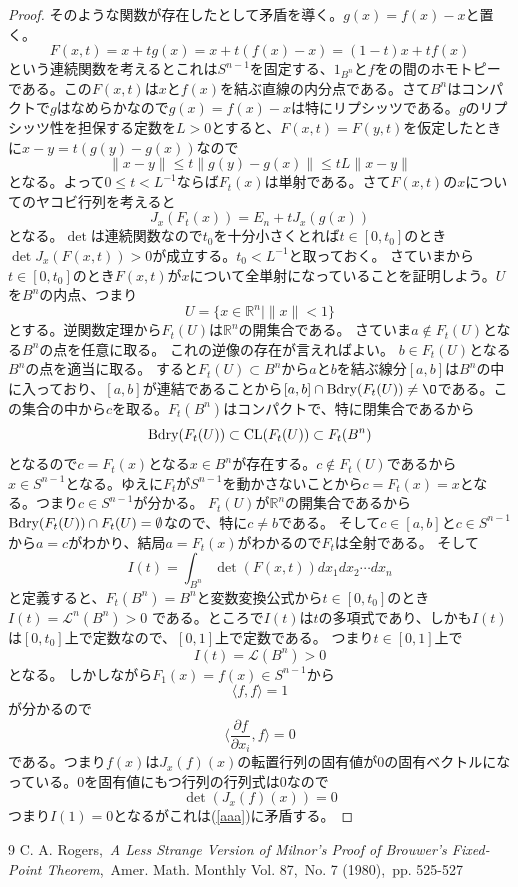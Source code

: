 \documentclass[leqno]{jsarticle}
\newcommand{\rr}{\mathbb{R}}
\newcommand{\bd}{\text{{\rm Bdry}}}
\newcommand{\cl}{\text{{\rm CL}}}
\newcommand{\LL}{\mathcal{L}}
\begin{document}
\begin{proof}
そのような関数が存在したとして矛盾を導く。$g(x)=f(x)-x$と置く。
\[
F(x,t)=x+tg(x)=x+t(f(x)-x)=(1-t)x+tf(x)
\]
という連続関数を考えるとこれは$S^{n-1}$を固定する、$1_{B^n}$と$f$をの間のホモトピーである。この$F(x,t)$は$x$と$f(x)$を結ぶ直線の内分点である。さて$B^n$はコンパクトで$g$はなめらかなので$g(x)=f(x)-x$は特にリプシッツである。$g$のリプシッツ性を担保する定数を$L>0$とすると、$F(x,t)=F(y,t)$を仮定したときに$x-y=t(g(y)-g(x))$なので
\[
\|x-y\|\le t\|g(y)-g(x)\|\le tL\|x-y\|
\]
となる。よって$0\le t< L^{-1}$ならば$F_t(x)$は単射である。さて$F(x,t)$の$x$についてのヤコビ行列を考えると
\[
J_x(F_t(x))=E_n+tJ_x(g(x))
\]
となる。$\det$は連続関数なので$t_0$を十分小さくとれば$t\in [0,t_0]$のとき$\det J_x(F(x,t))>0$が成立する。$t_0< L^{-1}$と取っておく。
さていまから$t\in [0,t_0]$のとき$F(x,t)$が$x$について全単射になっていることを証明しよう。$U$を$B^n$の内点、つまり
\[
U=\{x\in \rr^n\mid \|x\|<1\}
\]
とする。逆関数定理から$F_t(U)$は$\rr^n$の開集合である。
さていま$a\not\in F_t(U)$となる$B^n$の点を任意に取る。
これの逆像の存在が言えればよい。
$b\in F_t(U)$となる$B^n$の点を適当に取る。
すると$F_t(U)\subset B^n$から$a$と$b$を結ぶ線分$[a,b]$は$B^n$の中に入っており、$[a,b]$が連結であることから$[a,b]\cap\bd(F_t(U))\neq \O$である。この集合の中から$c$を取る。$F_t(B^n)$はコンパクトで、特に閉集合であるから
\[
\bd(F_t(U))\subset \cl(F_t(U))\subset  F_t(B^n)
\]
となるので$c=F_t(x)$となる$x\in B^n$が存在する。$c\not\in F_t(U)$であるから$x\in S^{n-1}$となる。ゆえに$F_t$が$S^{n-1}$を動かさないことから$c=F_t(x)=x$となる。つまり$c\in S^{n-1}$が分かる。
$F_t(U)$が$\rr^n$の開集合であるから$\bd(F_t(U))\cap F_t(U)=\emptyset$なので、特に$c\neq b$である。
そして$c\in [a,b]$と$c\in S^{n-1}$から$a=c$がわかり、結局$a=F_t(x)$がわかるので$F_t$は全射である。
そして
\[
I(t)=\int_{B^n}\det(F(x,t))dx_1dx_2\cdots dx_n
\]
と定義すると、$F_t(B^n)=B^n$と変数変換公式から$t\in [0,t_0]$のとき$I(t)=\LL^n(B^n)>0$
である。ところで$I(t)$は$t$の多項式であり、しかも$I(t)$は$[0,t_0]$上で定数なので、$[0,1]$上で定数である。
つまり$t\in [0,1]$上で
\begin{equation}\label{aaa}
I(t)=\LL(B^n)>0
\end{equation}
となる。
しかしながら$F_1(x)=f(x)\in S^{n-1}$から
\[
\langle f,f\rangle =1
\]
が分かるので
\[
\langle\frac{\partial f}{\partial x_i}, f\rangle=0
\]
である。つまり$f(x)$は$J_x(f)(x)$の転置行列の固有値が$0$の固有ベクトルになっている。$0$を固有値にもつ行列の行列式は$0$なので
\[
\det (J_x(f)(x))=0
\]
つまり$I(1)=0$となるがこれは(\ref{aaa})に矛盾する。
\end{proof}
















	
\begin{thebibliography}{9}
C. A. Rogers,\ \textit{A Less Strange Version of Milnor's Proof of Brouwer's Fixed-Point Theorem},\ Amer. Math. Monthly
Vol. 87,\ No. 7 (1980),\ pp. 525-527
\end{thebibliography}




			
\end{document}
